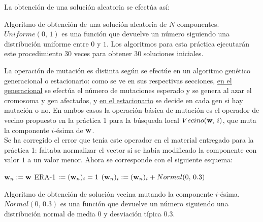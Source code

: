 \documentclass{article}
\newenvironment{algo}{
	\vspace*{0.5cm}
	\begin{algorithm}[H]}{
	\end{algorithm}
	\vspace*{0.5cm}
}
\begin{document}
\newpage
La obtención de una solución aleatoria se efectúa así:

\begin{algo}
	\vspace{0.2cm}
	\caption{Algoritmo de obtención de una solución aleatoria de $N$ componentes. $Uniforme(0,\, 1)$ es una función que devuelve un número siguiendo una distribución uniforme entre $0$ y $1$. Los algoritmos para esta práctica ejecutarán este procedimiento $30$ veces para obtener $30$ soluciones iniciales.}
\end{algo}

La operación de mutación es distinta según se efectúe en un algoritmo genético generacional o estacionario: como se ve en sus respectivas secciones, \hyperref[mutar-pob]{en el generacional} se efectúa el número de mutaciones esperado y se genera al azar el cromosoma y gen afectados, y \hyperref[mutar-cr]{en el estacionario} se decide en cada gen si hay mutación o no. En ambos casos la operación básica de mutación es el operador de vecino propuesto en la práctica 1 para la búsqueda local $Vecino(\textbf w,\, i)$, que muta la componente $i$-ésima de $\textbf w$. \\

Se ha corregido el error que tenía este operador en el material entregado para la práctica 1: faltaba normalizar el vector si se había modificado la componente con valor $1$ a un valor menor. Ahora se corresponde con el siguiente esquema:

\begin{algo}
	
	$\normalfont \textbf w_n := \normalfont \textbf w$\;
	ERA-1 $:= (\normalfont \textbf w_n)_i = 1$\;
	$(\normalfont \textbf w_n)_i := (\normalfont \textbf w_n)_i + Normal(0,\, 0.3)$\;
	\vspace{0.2cm}
	\caption{Algoritmo de obtención de solución vecina mutando la componente $i$-ésima. $Normal(0,\, 0.3)$ es una función que devuelve un número siguiendo una distribución normal de media $0$ y desviación típica $0.3$.}
\end{algo}
\end{document}
